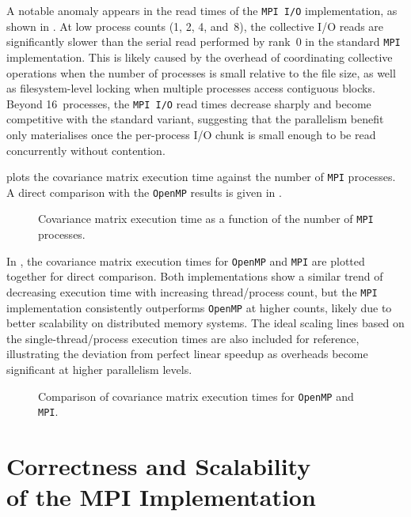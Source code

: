 A notable anomaly appears in the read times of the \texttt{MPI I/O} implementation,
as shown in . At low process counts (1, 2, 4, and~8),
the collective I/O reads are significantly slower than the serial read performed
by rank~0 in the standard \texttt{MPI} implementation. This is likely caused by
the overhead of coordinating collective operations when the number of processes is
small relative to the file size, as well as filesystem-level locking when multiple
processes access contiguous blocks. Beyond 16~processes, the \texttt{MPI I/O}
read times decrease sharply and become competitive with the standard variant,
suggesting that the parallelism benefit only materialises once the per-process
I/O chunk is small enough to be read concurrently without contention.

 plots the covariance matrix execution time against the
number of \texttt{MPI} processes. A direct comparison with the \texttt{OpenMP}
results is given in .

\begin{figure}[ht!]
    \centering
    
    \caption{Covariance matrix execution time as a function of the number of
             \texttt{MPI} processes.}
    \label{fig:Cov_MPI_graph}
\end{figure}

In , the covariance matrix execution times for
\texttt{OpenMP} and \texttt{MPI} are plotted together for direct comparison.
Both implementations show a similar trend of decreasing execution time with
increasing thread/process count, but the \texttt{MPI} implementation consistently
outperforms \texttt{OpenMP} at higher counts, likely due to better scalability on
distributed memory systems. The ideal scaling lines based on the single-thread/process
execution times are also included for reference, illustrating the deviation from
perfect linear speedup as overheads become significant at higher parallelism levels.

\begin{figure}[ht!]
    \centering
    
    \caption{Comparison of covariance matrix execution times for \texttt{OpenMP}
             and \texttt{MPI}.}
    \label{fig:Cov_comp_graph}
\end{figure}

\section{Correctness and Scalability\\of the MPI Implementation}
\label{sec:correctness}


